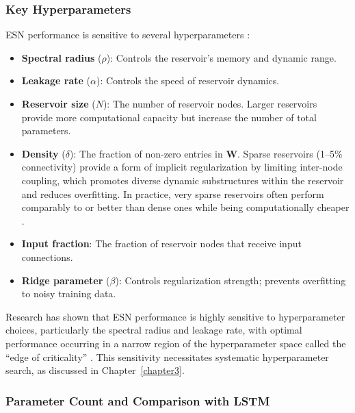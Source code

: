 \subsubsection{Key Hyperparameters}

ESN performance is sensitive to several hyperparameters \cite{lukosevicius2012practical, matzner2022hyperparameter}:
\begin{itemize}
    \item \textbf{Spectral radius} ($\rho$): Controls the reservoir's memory and dynamic range.
    \item \textbf{Leakage rate} ($\alpha$): Controls the speed of reservoir dynamics.
    \item \textbf{Reservoir size} ($N$): The number of reservoir nodes. Larger reservoirs provide more computational capacity but increase the number of total parameters.
    \item \textbf{Density} ($\delta$): The fraction of non-zero entries in $\mathbf{W}$. Sparse reservoirs (1--5\% connectivity) provide a form of implicit regularization by limiting inter-node coupling, which promotes diverse dynamic substructures within the reservoir and reduces overfitting. In practice, very sparse reservoirs often perform comparably to or better than dense ones while being computationally cheaper \cite{lukosevicius2009reservoir}.
    \item \textbf{Input fraction}: The fraction of reservoir nodes that receive input connections.
    \item \textbf{Ridge parameter} ($\beta$): Controls regularization strength; prevents overfitting to noisy training data.
\end{itemize}

Research has shown that ESN performance is highly sensitive to hyperparameter choices, particularly the spectral radius and leakage rate, with optimal performance occurring in a narrow region of the hyperparameter space called the ``edge of criticality'' \cite{matzner2022hyperparameter, mwamsojo2024stochastic}. This sensitivity necessitates systematic hyperparameter search, as discussed in Chapter~\ref{chapter3}.

\subsubsection{Parameter Count and Comparison with LSTM}
\label{sec:param_count}

